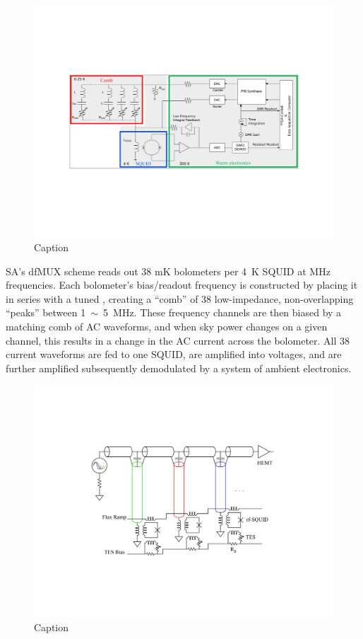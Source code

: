 \begin{figure}[!t]
    \centering
    \includegraphics[width=\linewidth, trim=3cm 6.3cm 3cm 6.3cm, clip]{InstrumentOverview/Figures/dfmux_readout.pdf}
    \caption{Caption}
    \label{fig:dfmux_readout}
\end{figure}

SA's dfMUX scheme reads out 38 mK bolometers per 4~K SQUID at MHz frequencies. Each bolometer's bias/readout frequency is constructed by placing it in series with a tuned , creating a ``comb'' of 38 low-impedance, non-overlapping ``peaks'' between 1~$\sim$~5~MHz. These frequency channels are then biased by a matching comb of AC waveforms, and when sky power changes on a given channel, this results in a change in the AC current across the bolometer. All 38 current waveforms are fed to one SQUID, are amplified into voltages, and are further amplified subsequently demodulated by a system of ambient electronics.

\begin{figure}[!t]
    \centering
    \includegraphics[width=\linewidth, trim=4cm 5.5cm 4cm 5cm, clip]{InstrumentOverview/Figures/umux_readout.pdf}
    \caption{Caption}
    \label{fig:umux_readout}
\end{figure}

